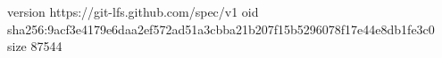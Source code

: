 version https://git-lfs.github.com/spec/v1
oid sha256:9acf3e4179e6daa2ef572ad51a3cbba21b207f15b5296078f17e44e8db1fe3c0
size 87544
